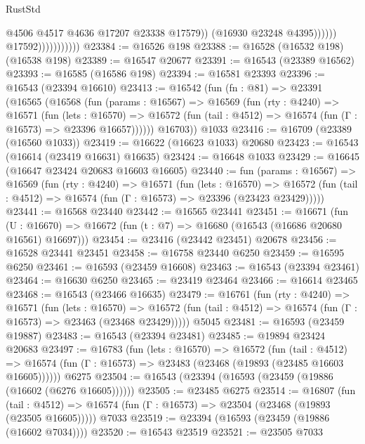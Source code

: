 \begin{lexlean}{RustStd}
\begin{coremodule}
                                        @4506
                                        @4517
                                        @4636
                                        @17207
                                        @23338
                                        @17579))
                                    (@16930 @23248 @4395))))))
                          @17592)))))))))))
@23384 := @16526 @198
@23388 := @16528 (@16532 @198) (@16538 @198)
@23389 := @16547 @20677
@23391 := @16543 (@23389 @16562)
@23393 := @16585 (@16586 @198)
@23394 := @16581 @23393
@23396 := @16543 (@23394 @16610)
@23413 := @16542
    (fun (fn : @81) =>
    @23391
      (@16565
        (@16568
          (fun (params : @16567) =>
          @16569
            (fun (rty : @4240) =>
            @16571
              (fun (lets : @16570) =>
              @16572 (fun (tail : @4512) => @16574 (fun (Γ : @16573) => @23396 @16657))))))
        @16703))
    @1033
@23416 := @16709 (@23389 (@16560 @1033))
@23419 := @16622 (@16623 @1033) @20680
@23423 := @16543 (@16614 (@23419 @16631) @16635)
@23424 := @16648 @1033
@23429 := @16645 (@16647 @23424 @20683 @16603 @16605)
@23440 := fun (params : @16567) =>
  @16569
    (fun (rty : @4240) =>
    @16571
      (fun (lets : @16570) =>
      @16572 (fun (tail : @4512) => @16574 (fun (Γ : @16573) => @23396 (@23423 @23429)))))
@23441 := @16568 @23440
@23442 := @16565 @23441
@23451 := @16671
    (fun (U : @16670) => @16672 (fun (t : @7) => @16680 (@16543 (@16686 @20680 @16561) @16697)))
@23454 := @23416 (@23442 @23451) @20678
@23456 := @16528 @23441 @23451
@23458 := @16758 @23440 @6250
@23459 := @16595 @6250
@23461 := @16593 (@23459 @16608)
@23463 := @16543 (@23394 @23461)
@23464 := @16630 @6250
@23465 := @23419 @23464
@23466 := @16614 @23465
@23468 := @16543 (@23466 @16635)
@23479 := @16761
    (fun (rty : @4240) =>
    @16571
      (fun (lets : @16570) =>
      @16572 (fun (tail : @4512) => @16574 (fun (Γ : @16573) => @23463 (@23468 @23429)))))
    @5045
@23481 := @16593 (@23459 @19887)
@23483 := @16543 (@23394 @23481)
@23485 := @19894 @23424 @20683
@23497 := @16783
    (fun (lets : @16570) =>
    @16572
      (fun (tail : @4512) =>
      @16574 (fun (Γ : @16573) => @23483 (@23468 (@19893 (@23485 @16603 @16605))))))
    @6275
@23504 := @16543 (@23394 (@16593 (@23459 (@19886 (@16602 (@6276 @16605))))))
@23505 := @23485 @6275
@23514 := @16807
    (fun (tail : @4512) => @16574 (fun (Γ : @16573) => @23504 (@23468 (@19893 (@23505 @16605)))))
    @7033
@23519 := @23394 (@16593 (@23459 (@19886 (@16602 @7034))))
@23520 := @16543 @23519
@23521 := @23505 @7033

\end{coremodule}
\end{lexlean}
